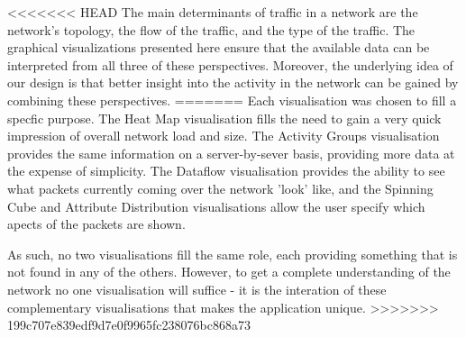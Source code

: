 <<<<<<< HEAD
The main determinants of traffic in a network are the network's topology, the flow of the traffic, and the type of the traffic. The graphical visualizations presented here ensure that the available data can be interpreted from all three of these perspectives. Moreover, the underlying idea of our design is that better insight into the activity in the network can be gained by combining these perspectives.
=======
Each visualisation was chosen to fill a specfic purpose.  The Heat Map visualisation fills the need to gain a very quick impression of overall network load and size.  The Activity Groups visualisation provides the same information on a server-by-sever basis, providing more data at the expense of simplicity.  The Dataflow visualisation provides the ability to see what packets currently coming over the network 'look' like, and the Spinning Cube and Attribute Distribution visualisations allow the user specify which apects of the packets are shown.

As such, no two visualisations fill the same role, each providing something that is not found in any of the others.  However, to get a complete understanding of the network no one visualisation will suffice - it is the interation of these complementary visualisations that makes the application unique.
>>>>>>> 199c707e839edf9d7e0f9965fc238076bc868a73
